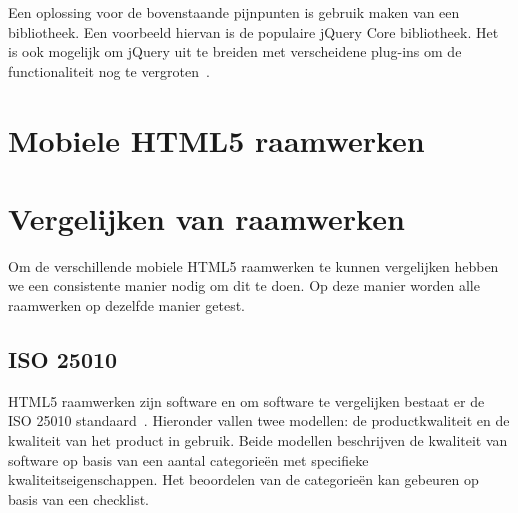 Een oplossing voor de bovenstaande pijnpunten is gebruik maken van een bibliotheek. Een voorbeeld hiervan is de populaire jQuery Core bibliotheek. Het is ook mogelijk om jQuery uit te breiden met verscheidene plug-ins om de functionaliteit nog te vergroten~\cite{McFarland2011}.



\section{Mobiele HTML5 raamwerken}
\label{sec:mobiele-html5-raamwerken}


\section{Vergelijken van raamwerken}
\label{sec:vergelijken-raamwerken}
Om de verschillende mobiele HTML5 raamwerken te kunnen vergelijken hebben we een consistente manier nodig om dit te doen.  Op deze manier worden alle raamwerken op dezelfde manier getest.

\subsection{ISO 25010}
HTML5 raamwerken zijn software en om software te vergelijken bestaat er de ISO 25010 standaard~\cite{Standard2010}.  Hieronder vallen twee modellen:  de productkwaliteit en de kwaliteit van het product in gebruik.  Beide modellen beschrijven de kwaliteit van software op basis van een aantal categorieën met specifieke kwaliteitseigenschappen. Het beoordelen van de categorieën kan gebeuren op basis van een checklist. 

 
